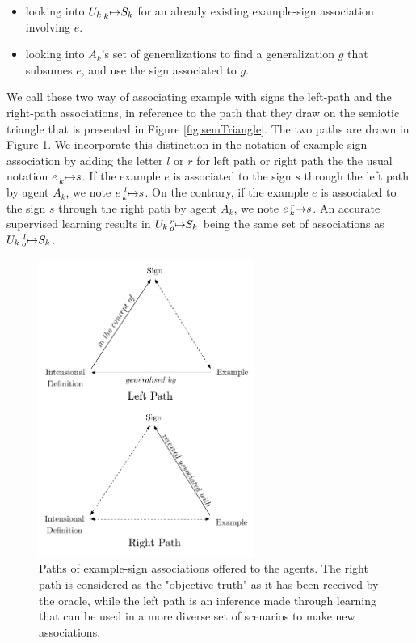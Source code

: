\begin{itemize}
    \item looking into $U_{k} \prescript{}{k}{\mapsto} S_{k}$ for an already existing example-sign association involving $e$.
    \item looking into $A_{k}$'s set of generalizations to find a generalization $g$ that subsumes $e$, and use the sign associated to $g$.
\end{itemize}

We call these two way of associating example with signs the left-path and the right-path associations, in reference to the path that they draw on the semiotic triangle that is presented in Figure \ref{fig:semTriangle}. The two paths are drawn in Figure \ref{fig:path}. We incorporate this distinction in the notation of example-sign association by adding the letter $l$ or $r$ for left path or right path the the usual notation $e \prescript{}{k}{\mapsto} s$. If the example $e$ is associated to the sign $s$ through the left path by agent $A_{k}$, we note $e \prescript{l}{k}{\mapsto} s$. On the contrary, if the example $e$ is associated to the sign $s$ through the right path by agent $A_{k}$, we note $e \prescript{r}{k}{\mapsto} s$. An accurate supervised learning results in  $U_{k} \prescript{r}{o}{\mapsto} S_{k}$ being the same set of associations as $U_{k} \prescript{l}{o}{\mapsto} S_{k}$.

\begin{figure}[t]
    \centering
    \includegraphics[width = 200pt]{figs/paths.pdf}
    \caption{Paths of example-sign associations offered to the agents. The right path is considered as the "objective truth" as it has been received by the oracle, while the left path is an inference made through learning that can be used in a more diverse set of scenarios to make new associations.}
    \label{fig:path}
\end{figure}


